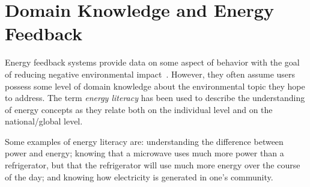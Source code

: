 \documentclass[10pt, conference, compsocconf]{IEEEtran}
\begin{document}
%
%
%
%


\section{Domain Knowledge and Energy Feedback}

Energy feedback systems provide data on some aspect of behavior with the goal of reducing negative environmental impact~\cite{Froehlich2010}. However, they often assume users possess some level of domain knowledge about the environmental topic they hope to address. The term \emph{energy literacy} has been used to describe the understanding of energy concepts as they relate both on the individual level and on the national/global level.

Some examples of energy literacy are: understanding the difference between power and energy;	knowing that a microwave uses much more power than a refrigerator, but that the refrigerator will use much more energy over the course of the day; and knowing how electricity is generated in one's community.
\end{document}
